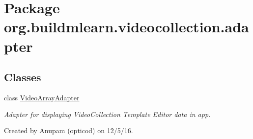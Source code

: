 \hypertarget{namespaceorg_1_1buildmlearn_1_1videocollection_1_1adapter}{}\section{Package org.\+buildmlearn.\+videocollection.\+adapter}
\label{namespaceorg_1_1buildmlearn_1_1videocollection_1_1adapter}
\subsection*{Classes}
\begin{DoxyCompactItemize}
\item 
class \hyperlink{classorg_1_1buildmlearn_1_1videocollection_1_1adapter_1_1VideoArrayAdapter}{Video\+Array\+Adapter}
\begin{DoxyCompactList}\small\item\em Adapter for displaying Video\+Collection Template Editor data in app. 

Created by Anupam (opticod) on 12/5/16. \end{DoxyCompactList}\end{DoxyCompactItemize}
